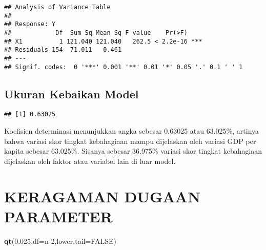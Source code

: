 \documentclass[
]{article}
\newenvironment{Shaded}{\begin{snugshade}}{\end{snugshade}}
\newcommand{\AttributeTok}[1]{\textcolor[rgb]{0.13,0.29,0.53}{#1}}
\newcommand{\ConstantTok}[1]{\textcolor[rgb]{0.56,0.35,0.01}{#1}}
\newcommand{\DecValTok}[1]{\textcolor[rgb]{0.00,0.00,0.81}{#1}}
\newcommand{\FloatTok}[1]{\textcolor[rgb]{0.00,0.00,0.81}{#1}}
\newcommand{\FunctionTok}[1]{\textcolor[rgb]{0.13,0.29,0.53}{\textbf{#1}}}
\newcommand{\NormalTok}[1]{#1}
\newcommand{\OtherTok}[1]{\textcolor[rgb]{0.56,0.35,0.01}{#1}}
\newcommand{\SpecialCharTok}[1]{\textcolor[rgb]{0.81,0.36,0.00}{\textbf{#1}}}
\newcommand{\StringTok}[1]{\textcolor[rgb]{0.31,0.60,0.02}{#1}}
\begin{document}
\begin{verbatim}
## Analysis of Variance Table
## 
## Response: Y
##            Df  Sum Sq Mean Sq F value    Pr(>F)    
## X1          1 121.040 121.040   262.5 < 2.2e-16 ***
## Residuals 154  71.011   0.461                      
## ---
## Signif. codes:  0 '***' 0.001 '**' 0.01 '*' 0.05 '.' 0.1 ' ' 1
\end{verbatim}

\hypertarget{ukuran-kebaikan-model}{%
\subsection{\texorpdfstring{ Ukuran Kebaikan
Model}{ Ukuran Kebaikan Model}}\label{ukuran-kebaikan-model}}

\begin{Shaded}
\end{Shaded}

\begin{verbatim}
## [1] 0.63025
\end{verbatim}

Koefisien determinasi menunjukkan angka sebesar 0.63025 atau 63.025\%,
artinya bahwa variasi skor tingkat kebahagiaan mampu dijelaskan oleh
variasi GDP per kapita sebesar 63.025\%. Sisanya sebesar 36.975\%
variasi skor tingkat kebahagiaan dijelaskan oleh faktor atau variabel
lain di luar model.

\hypertarget{keragaman-dugaan-parameter}{%
\section{\texorpdfstring{ KERAGAMAN DUGAAN
PARAMETER}{ KERAGAMAN DUGAAN PARAMETER}}\label{keragaman-dugaan-parameter}}

\begin{Shaded}
\begin{Highlighting}[]
\FunctionTok{qt}\NormalTok{(}\FloatTok{0.025}\NormalTok{,}\AttributeTok{df=}\NormalTok{n}\DecValTok{{-}2}\NormalTok{,}\AttributeTok{lower.tail=}\ConstantTok{FALSE}\NormalTok{)}
\end{Highlighting}
\end{Shaded}
\end{document}
